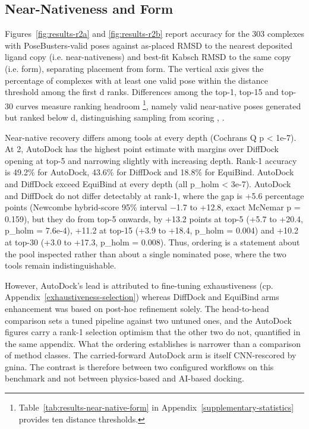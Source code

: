 \hypertarget{near-nativeness-and-form}{%
\subsection{Near-Nativeness and Form}\label{near-nativeness-and-form}}

Figures~\ref{fig:results-r2a} and \ref{fig:results-r2b} report accuracy for the 303 complexes with PoseBusters-valid poses against as-placed RMSD to the nearest deposited ligand copy (i.e. near-nativeness) and best-fit Kabsch RMSD to the same copy (i.e. form), separating placement from form. The vertical axis gives the percentage of complexes with at least one valid pose within the distance threshold among the first d ranks. Differences among the top-1, top-15 and top-30 curves measure ranking headroom \footnote{Table~\ref{tab:results-near-native-form} in Appendix~\ref{supplementary-statistics} provides ten distance thresholds.}, namely valid near-native poses generated but ranked below d, distinguishing sampling from scoring \cite{ref050}, \cite{ref052}. 

Near-native recovery differs among tools at every depth (Cochran\textquotesingle s Q p \textless{} 1e-7). At 2\angstrom{}, AutoDock has the highest point estimate with margins over DiffDock opening at top-5 and narrowing slightly with increasing depth. Rank-1 accuracy is 49.2\% for AutoDock, 43.6\% for DiffDock and 18.8\% for EquiBind. AutoDock and DiffDock exceed EquiBind at every depth (all p\_holm \textless{} 3e-7). AutoDock and DiffDock do not differ detectably at rank-1, where the gap is +5.6 percentage points (Newcombe hybrid-score 95\% interval \ensuremath{-}1.7 to +12.8, exact McNemar p = 0.159), but they do from top-5 onwards, by +13.2 points at top-5 (+5.7 to +20.4, p\_holm = 7.6e-4), +11.2 at top-15 (+3.9 to +18.4, p\_holm = 0.004) and +10.2 at top-30 (+3.0 to +17.3, p\_holm = 0.008). Thus, ordering is a statement about the pool inspected rather than about a single nominated pose, where the two tools remain indistinguishable. 

However, AutoDock's lead is attributed to fine-tuning exhaustiveness (cp. Appendix~\ref{exhaustiveness-selection}) whereas DiffDock and EquiBind arms enhancement was based on post-hoc refinement solely. The head-to-head comparison sets a tuned pipeline against two untuned ones, and the AutoDock figures carry a rank-1 selection optimism that the other two do not, quantified in the same appendix. What the ordering establishes is narrower than a comparison of method classes. The carried-forward AutoDock arm is itself CNN-rescored by gnina. The contrast is therefore between two configured workflows on this benchmark and not between physics-based and AI-based docking.


